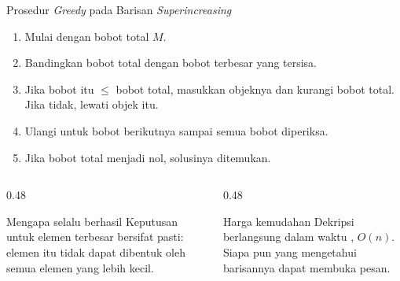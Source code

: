 \documentclass[aspectratio=169,11pt]{beamer}
\begin{document}
\begin{frame}{Prosedur \textit{Greedy} pada Barisan \textit{Superincreasing}}
    \begin{enumerate}
        \item Mulai dengan bobot total $M$.
        \item Bandingkan bobot total dengan bobot terbesar yang tersisa.
        \item Jika bobot itu $\le$ bobot total, masukkan objeknya dan kurangi
              bobot total. Jika tidak, lewati objek itu.
        \item Ulangi untuk bobot berikutnya sampai semua bobot diperiksa.
        \item Jika bobot total menjadi nol, solusinya ditemukan.
    \end{enumerate}
    \vspace{0.15cm}
    \begin{columns}[T,onlytextwidth]
        \begin{column}{0.48\textwidth}
            \begin{block}{Mengapa selalu berhasil}
                \footnotesize
                Keputusan untuk elemen terbesar bersifat pasti: elemen itu
                tidak dapat dibentuk oleh semua elemen yang lebih kecil.
            \end{block}
        \end{column}
        \begin{column}{0.48\textwidth}
            \begin{alertblock}{Harga kemudahan}
                \footnotesize
                Dekripsi berlangsung dalam waktu , $O(n)$.
                Siapa pun yang mengetahui barisannya dapat membuka pesan.
            \end{alertblock}
        \end{column}
    \end{columns}
\end{frame}
\end{document}
